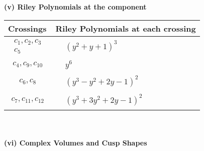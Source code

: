 \documentclass[1p]{elsarticle_modified}
\theoremstyle{definition}
\begin{document}
\newpage\renewcommand{\arraystretch}{1}
\flushleft \textbf{(v) Riley Polynomials at the component}\newline \\
\begin{tabular}{m{50pt}|m{274pt}}
Crossings & \hspace{64pt}Riley Polynomials at each crossing \\
\hline $$\begin{aligned}c_{1},c_{2},c_{3}\\c_{5}\end{aligned}$$&$\begin{aligned}
&(y^2+y+1)^3
\end{aligned}$\\
\hline $$\begin{aligned}c_{4},c_{9},c_{10}\end{aligned}$$&$\begin{aligned}
&y^6
\end{aligned}$\\
\hline $$\begin{aligned}c_{6},c_{8}\end{aligned}$$&$\begin{aligned}
&(y^3- y^2+2 y-1)^2
\end{aligned}$\\
\hline $$\begin{aligned}c_{7},c_{11},c_{12}\end{aligned}$$&$\begin{aligned}
&(y^3+3 y^2+2 y-1)^2
\end{aligned}$\\
\hline
\end{tabular}\\~\\
\newpage\flushleft \textbf{(vi) Complex Volumes and Cusp Shapes}
\end{document}
